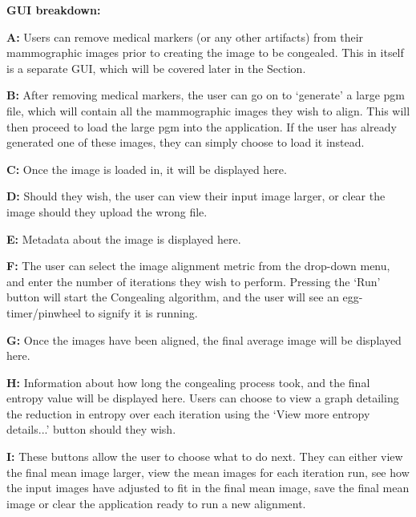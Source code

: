 \vspace{2cm}

\noindent \textbf{\acrshort{GUI} breakdown: }

\noindent \textbf{ A: } Users can remove medical markers (or any other artifacts) from their mammographic images prior to creating the image to be congealed. This in itself is a separate \acrshort{GUI}, which will be covered later in the Section.

\noindent \textbf{ B: } After removing medical markers, the user can go on to `generate' a large pgm file, which will contain all the mammographic images they wish to align. This will then proceed to load the large pgm into the application. If the user has already generated one of these images, they can simply choose to load it instead.

\noindent \textbf{ C: } Once the image is loaded in, it will be displayed here.

\noindent \textbf{ D: } Should they wish, the user can view their input image larger, or clear the image should they upload the wrong file.

\noindent \textbf{ E: } Metadata about the image is displayed here.

\noindent \textbf{ F: } The user can select the image alignment metric from the drop-down menu, and enter the number of iterations they wish to perform. Pressing the `Run' button will start the \Gls{Congealing} algorithm, and the user will see an egg-timer/pinwheel to signify it is running.

\noindent \textbf{ G: } Once the images have been aligned, the final average image will be displayed here.

\noindent \textbf{ H: } Information about how long the congealing process took, and the final entropy value will be displayed here. Users can choose to view a graph detailing the reduction in entropy over each iteration using the `View more entropy details...' button should they wish.

\noindent \textbf{ I: } These buttons allow the user to choose what to do next. They can either view the final mean image larger, view the mean images for each iteration run, see how the input images have adjusted to fit in the final mean image, save the final mean image or clear the application ready to run a new alignment.

